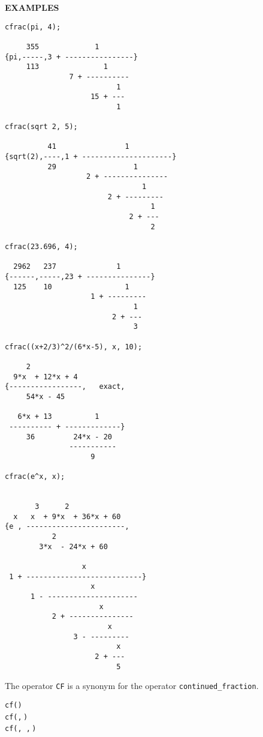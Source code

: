 {\large\textbf{EXAMPLES}}
\begin{verbatim}
cfrac(pi, 4);

     355             1
{pi,-----,3 + ----------------}
     113               1
               7 + ----------
                          1
                    15 + ---
                          1

cfrac(sqrt 2, 5);

          41                1
{sqrt(2),----,1 + ---------------------}
          29                  1
                   2 + ---------------
                                1
                        2 + ---------
                                  1
                             2 + ---
                                  2

cfrac(23.696, 4);

  2962   237              1
{------,-----,23 + ---------------}
  125    10                 1
                    1 + ---------
                              1
                         2 + ---
                              3

cfrac((x+2/3)^2/(6*x-5), x, 10);

     2
  9*x  + 12*x + 4
{-----------------,   exact,
     54*x - 45

   6*x + 13          1
 ---------- + -------------}
     36         24*x - 20
               -----------
                    9

cfrac(e^x, x);


       3      2
  x   x  + 9*x  + 36*x + 60
{e , -----------------------,
           2
        3*x  - 24*x + 60

                  x
 1 + ---------------------------}
                    x
      1 - ---------------------
                      x
           2 + ---------------
                        x
                3 - ---------
                          x
                     2 + ---
                          5
\end{verbatim}

\hypertarget{operator:CF}{}

The operator \texttt{CF}  is a
synonym for the operator \texttt{continued\_fraction}.
\begin{syntaxtable}
  \texttt{cf(}\texttt{)}\\
  \texttt{cf(}\texttt{,}\,\texttt{)}\\
  \texttt{cf(}\texttt{,}\,%
  \texttt{,}\,\texttt{)}
\end{syntaxtable}

